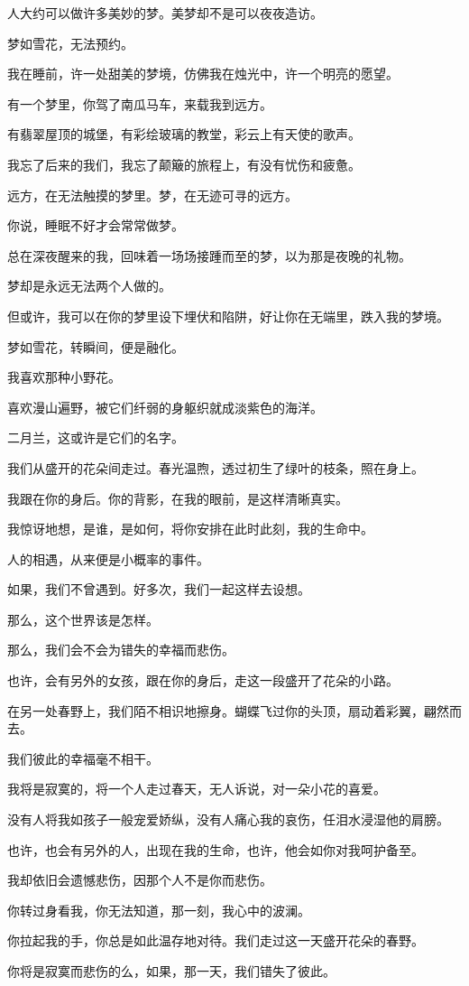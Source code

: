 
		人大约可以做许多美妙的梦。美梦却不是可以夜夜造访。\par
		梦如雪花，无法预约。\par
		我在睡前，许一处甜美的梦境，仿佛我在烛光中，许一个明亮的愿望。\par
		有一个梦里，你驾了南瓜马车，来载我到远方。\par
		有翡翠屋顶的城堡，有彩绘玻璃的教堂，彩云上有天使的歌声。\par
		我忘了后来的我们，我忘了颠簸的旅程上，有没有忧伤和疲惫。\par
		远方，在无法触摸的梦里。梦，在无迹可寻的远方。\par
		你说，睡眠不好才会常常做梦。\par
		总在深夜醒来的我，回味着一场场接踵而至的梦，以为那是夜晚的礼物。\par
		梦却是永远无法两个人做的。\par
		但或许，我可以在你的梦里设下埋伏和陷阱，好让你在无端里，跌入我的梦境。\par
		梦如雪花，转瞬间，便是融化。


		我喜欢那种小野花。\par
		喜欢漫山遍野，被它们纤弱的身躯织就成淡紫色的海洋。\par
		二月兰，这或许是它们的名字。\par
		我们从盛开的花朵间走过。春光温煦，透过初生了绿叶的枝条，照在身上。\par
		我跟在你的身后。你的背影，在我的眼前，是这样清晰真实。\par
		我惊讶地想，是谁，是如何，将你安排在此时此刻，我的生命中。\par
		人的相遇，从来便是小概率的事件。\par
		如果，我们不曾遇到。好多次，我们一起这样去设想。\par
		那么，这个世界该是怎样。\par
		那么，我们会不会为错失的幸福而悲伤。\par
		也许，会有另外的女孩，跟在你的身后，走这一段盛开了花朵的小路。\par
		在另一处春野上，我们陌不相识地擦身。蝴蝶飞过你的头顶，扇动着彩翼，翩然而去。\par
		我们彼此的幸福毫不相干。\par
		我将是寂寞的，将一个人走过春天，无人诉说，对一朵小花的喜爱。\par
		没有人将我如孩子一般宠爱娇纵，没有人痛心我的哀伤，任泪水浸湿他的肩膀。\par
		也许，也会有另外的人，出现在我的生命，也许，他会如你对我呵护备至。\par
		我却依旧会遗憾悲伤，因那个人不是你而悲伤。\par
		你转过身看我，你无法知道，那一刻，我心中的波澜。\par
		你拉起我的手，你总是如此温存地对待。我们走过这一天盛开花朵的春野。\par
		你将是寂寞而悲伤的么，如果，那一天，我们错失了彼此。

